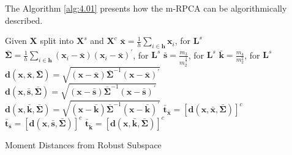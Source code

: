 The Algorithm \ref{alg:4.01} presents how the m-RPCA can be algorithmically described.
\begin{algorithm}
	\label{alg:4.01}
	\SetAlgoLined
	Given $\boldsymbol{X}$ split into $\boldsymbol{X}^s$ and $\boldsymbol{X}^c$\;
	$\bar{\boldsymbol{x}} = \displaystyle\frac{1}{h}\displaystyle\sum_{i\in \boldsymbol{h}} \boldsymbol{x}_i$, for $\boldsymbol{L}^s$\;
	$\boldsymbol{\bar{\Sigma}} = \displaystyle\frac{1}{h}\displaystyle\sum_{i\in \boldsymbol{h}} (\boldsymbol{x}_i - \bar{\boldsymbol{x}})(\boldsymbol{x}_i - \bar{\boldsymbol{x}})^\prime$, for $\boldsymbol{L}^s$\;
	$\boldsymbol{\bar{s}} = \frac{m_3}{m_2^{\frac{3}{2}}}$, for $\boldsymbol{L}^s$\;
	$\boldsymbol{\bar{k}} = \frac{m_4}{m_2^2}$, for $\boldsymbol{L}^s$\;
	$\boldsymbol{d}(\boldsymbol{x},\bar{\boldsymbol{x}}, \boldsymbol{\bar{\Sigma}}) = \sqrt{(\boldsymbol{x} - \bar{\boldsymbol{x}}) \boldsymbol{\bar{\Sigma}}^{-1}(\boldsymbol{x} - \bar{\boldsymbol{x}})^\prime}$\;
	$\boldsymbol{d}(\boldsymbol{x}, \bar{\boldsymbol{s}}, \boldsymbol{\bar{\Sigma}}) = \sqrt{(\boldsymbol{x} - \bar{\boldsymbol{s}}) \boldsymbol{\bar{\Sigma}}^{-1}(\boldsymbol{x} - \bar{\boldsymbol{s}})^\prime}$\;
	$\boldsymbol{d}(\boldsymbol{x}, \bar{\boldsymbol{k}}, \boldsymbol{\bar{\Sigma}}) = \sqrt{(\boldsymbol{x} - \bar{\boldsymbol{k}}) \boldsymbol{\bar{\Sigma}}^{-1}(\boldsymbol{x} - \bar{\boldsymbol{k}})^\prime}$\;
	$\boldsymbol{\bar{t}}_{\bar{\boldsymbol{x}}} = [\boldsymbol{d}(\boldsymbol{x}, \bar{\boldsymbol{x}}, \boldsymbol{\bar{\Sigma}})]^c$\;
	$\boldsymbol{\bar{t}}_{\bar{\boldsymbol{s}}} = [\boldsymbol{d}(\boldsymbol{x}, \bar{\boldsymbol{s}}, \boldsymbol{\bar{\Sigma}})]^c$\;
	$\boldsymbol{\bar{t}}_{\bar{\boldsymbol{k}}} = [\boldsymbol{d}(\boldsymbol{x}, \bar{\boldsymbol{k}}, \boldsymbol{\bar{\Sigma}})]^c$\;
	\caption{Moment Distances from Robust Subspace}
\end{algorithm}

